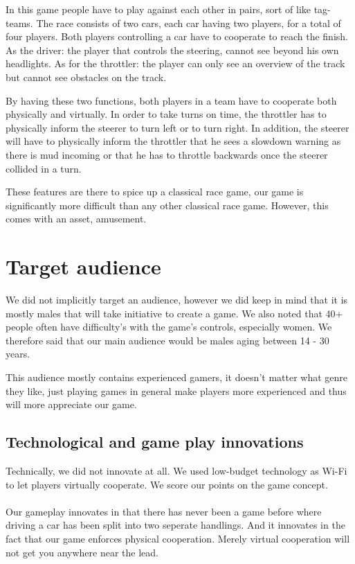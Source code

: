 \documentclass{sigchi}
\begin{document}
In this game people have to play against each other in pairs, sort of like tag-teams. The race consists of two cars, each car having two players, for a total of four players. Both players controlling a car have to cooperate to reach the finish. As the driver: the player that controls the steering, cannot see beyond his own headlights. As for the throttler: the player can only see an overview of the track but cannot see obstacles on the track.

By having these two functions, both players in a team have to cooperate both physically and virtually. In order to take turns on time, the throttler has to physically inform the steerer to turn left or to turn right. In addition, the steerer will have to physically inform the throttler that he sees a slowdown warning as there is mud incoming or that he has to throttle backwards once the steerer collided in a turn.

These features are there to spice up a classical race game, our game is significantly more difficult than any other classical race game. However, this comes with an asset, amusement. 

\section{Target audience}

We did not implicitly target an audience, however we did keep in mind that it is mostly males that will take initiative to create a game. We also noted that 40+ people often have difficulty's with the game's controls, especially women. We therefore said that our main audience would be males aging between 14 - 30 years.

This audience mostly contains experienced gamers, it doesn't matter what genre they like, just playing games in general make players more experienced and thus will more appreciate our game.

\subsection{Technological and game play innovations}

Technically, we did not innovate at all. We used low-budget technology as Wi-Fi to let players virtually cooperate. We score our points on the game concept.\\\\
Our gameplay innovates in that there has never been a game before where driving a car has been split into two seperate handlings. And it innovates in the fact that our game enforces physical cooperation. Merely virtual cooperation will not get you anywhere near the lead.
\end{document}
